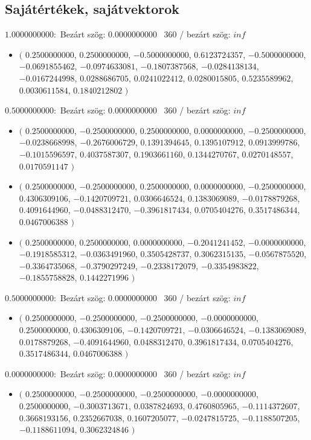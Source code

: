 \documentclass[14pt,a4paper]{article}
\begin{document}
\subsection{Sajátértékek, sajátvektorok}
$1.0000000000$:\
Bezárt szög: $0.0000000000$ \
360 / bezárt szög: $inf$\
\begin{itemize}
\item
$\big($
$0.2500000000$, $0.2500000000$, $-0.5000000000$, $0.6123724357$, $-0.5000000000$, $-0.0691855462$, $-0.0974633081$, $-0.1807387568$, $-0.0284138134$, $-0.0167244998$, $0.0288686705$, $0.0241022412$, $0.0280015805$, $0.5235589962$, $0.0030611584$, $0.1840212802$
$\big)$
\end{itemize}
$0.5000000000$:\
Bezárt szög: $0.0000000000$ \
360 / bezárt szög: $inf$\
\begin{itemize}
\item
$\big($
$0.2500000000$, $-0.2500000000$, $0.2500000000$, $0.0000000000$, $-0.2500000000$, $-0.0238668998$, $-0.2676006729$, $0.1391394645$, $0.1395107912$, $0.0913999786$, $-0.1015596597$, $0.4037587307$, $0.1903661160$, $0.1344270767$, $0.0270148557$, $0.0170591147$
$\big)$
\item
$\big($
$0.2500000000$, $-0.2500000000$, $0.2500000000$, $0.0000000000$, $-0.2500000000$, $0.4306309106$, $-0.1420709721$, $0.0306646524$, $0.1383069089$, $-0.0178879268$, $0.4091644960$, $-0.0488312470$, $-0.3961817434$, $0.0705404276$, $0.3517486344$, $0.0467006388$
$\big)$
\item
$\big($
$0.2500000000$, $0.2500000000$, $0.0000000000$, $-0.2041241452$, $-0.0000000000$, $-0.1918585312$, $-0.0363491960$, $0.3505428737$, $0.3062315135$, $-0.0567875520$, $-0.3364735068$, $-0.3790297249$, $-0.2338172079$, $-0.3354983822$, $-0.1855758828$, $0.1442271996$
$\big)$
\end{itemize}
$0.5000000000$:\
Bezárt szög: $0.0000000000$ \
360 / bezárt szög: $inf$\
\begin{itemize}
\item
$\big($
$0.2500000000$, $-0.2500000000$, $-0.2500000000$, $-0.0000000000$, $0.2500000000$, $0.4306309106$, $-0.1420709721$, $-0.0306646524$, $-0.1383069089$, $0.0178879268$, $-0.4091644960$, $0.0488312470$, $0.3961817434$, $0.0705404276$, $0.3517486344$, $0.0467006388$
$\big)$
\end{itemize}
$0.0000000000$:\
Bezárt szög: $0.0000000000$ \
360 / bezárt szög: $inf$\
\begin{itemize}
\item
$\big($
$0.2500000000$, $-0.2500000000$, $-0.2500000000$, $-0.0000000000$, $0.2500000000$, $-0.3003713671$, $0.0387824693$, $0.4760805965$, $-0.1114372607$, $0.3668193156$, $0.2352667038$, $0.1607205077$, $-0.0247815725$, $-0.1188507205$, $-0.1188611094$, $0.3062324846$
$\big)$
\end{itemize}
\end{document}
